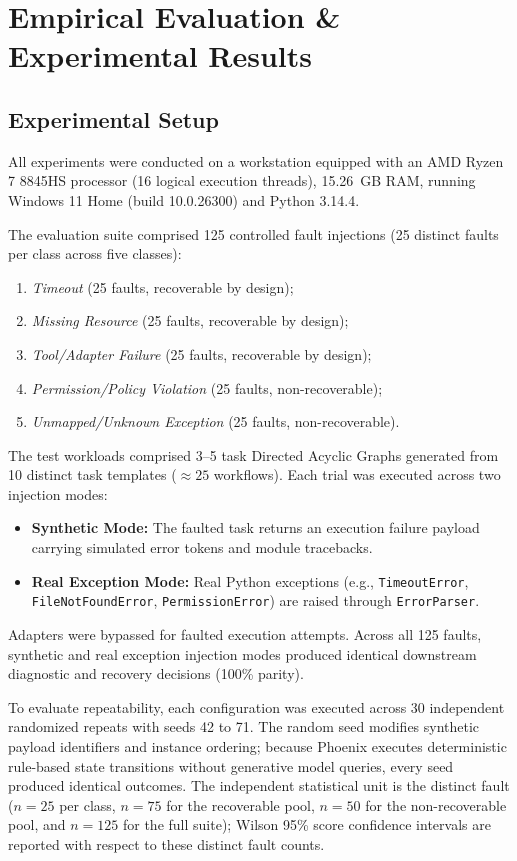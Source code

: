 \documentclass[conference]{IEEEtran}
\begin{document}
\section{Empirical Evaluation \& Experimental Results}

\subsection{Experimental Setup}
All experiments were conducted on a workstation equipped with an AMD Ryzen 7 8845HS processor (16 logical execution threads), 15.26~GB RAM, running Windows 11 Home (build 10.0.26300) and Python 3.14.4. 

The evaluation suite comprised 125 controlled fault injections (25 distinct faults per class across five classes):
\begin{enumerate}
    \item \textit{Timeout} (25 faults, recoverable by design);
    \item \textit{Missing Resource} (25 faults, recoverable by design);
    \item \textit{Tool/Adapter Failure} (25 faults, recoverable by design);
    \item \textit{Permission/Policy Violation} (25 faults, non-recoverable);
    \item \textit{Unmapped/Unknown Exception} (25 faults, non-recoverable).
\end{enumerate}
The test workloads comprised 3--5 task Directed Acyclic Graphs generated from 10 distinct task templates ($\approx 25$ workflows). Each trial was executed across two injection modes:
\begin{itemize}
    \item \textbf{Synthetic Mode:} The faulted task returns an execution failure payload carrying simulated error tokens and module tracebacks.
    \item \textbf{Real Exception Mode:} Real Python exceptions (e.g., \texttt{TimeoutError}, \texttt{FileNotFoundError}, \texttt{PermissionError}) are raised through \texttt{ErrorParser}.
\end{itemize}
Adapters were bypassed for faulted execution attempts. Across all 125 faults, synthetic and real exception injection modes produced identical downstream diagnostic and recovery decisions (100\% parity).

To evaluate repeatability, each configuration was executed across 30 independent randomized repeats with seeds 42 to 71. The random seed modifies synthetic payload identifiers and instance ordering; because Phoenix executes deterministic rule-based state transitions without generative model queries, every seed produced identical outcomes. The independent statistical unit is the distinct fault ($n=25$ per class, $n=75$ for the recoverable pool, $n=50$ for the non-recoverable pool, and $n=125$ for the full suite); Wilson 95\% score confidence intervals are reported with respect to these distinct fault counts.
\end{document}
